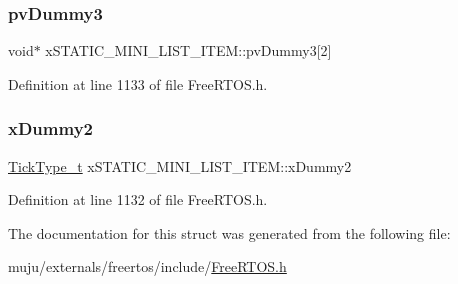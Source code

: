 \subsubsection{\texorpdfstring{pv\+Dummy3}{pvDummy3}}
{\footnotesize\ttfamily void$\ast$ x\+S\+T\+A\+T\+I\+C\+\_\+\+M\+I\+N\+I\+\_\+\+L\+I\+S\+T\+\_\+\+I\+T\+E\+M\+::pv\+Dummy3\mbox{[}2\mbox{]}}



Definition at line 1133 of file Free\+R\+T\+O\+S.\+h.

\mbox{\label{structx_s_t_a_t_i_c___m_i_n_i___l_i_s_t___i_t_e_m_a0cbe65e7e550dc4bca38579ccac6c512}} 
\subsubsection{\texorpdfstring{x\+Dummy2}{xDummy2}}
{\footnotesize\ttfamily \hyperlink{externals_2freertos_2portable_2_g_c_c_2_a_r_m___c_m0_2portmacro_8h_aa69c48c6e902ce54f70886e6573c92a9}{Tick\+Type\+\_\+t} x\+S\+T\+A\+T\+I\+C\+\_\+\+M\+I\+N\+I\+\_\+\+L\+I\+S\+T\+\_\+\+I\+T\+E\+M\+::x\+Dummy2}



Definition at line 1132 of file Free\+R\+T\+O\+S.\+h.



The documentation for this struct was generated from the following file\+:\begin{DoxyCompactItemize}
\item 
muju/externals/freertos/include/\hyperlink{externals_2freertos_2include_2_free_r_t_o_s_8h}{Free\+R\+T\+O\+S.\+h}\end{DoxyCompactItemize}
